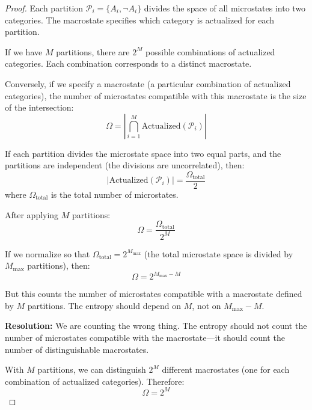 \documentclass[twocolumn,10pt]{article}
\theoremstyle{definition}
\theoremstyle{remark}
\begin{document}
\begin{proof}
Each partition $\mathcal{P}_i = \{A_i, \neg A_i\}$ divides the space of all microstates into two categories. The macrostate specifies which category is actualized for each partition.

If we have $M$ partitions, there are $2^M$ possible combinations of actualized categories. Each combination corresponds to a distinct macrostate.

Conversely, if we specify a macrostate (a particular combination of actualized categories), the number of microstates compatible with this macrostate is the size of the intersection:
\begin{equation}
\Omega = \left| \bigcap_{i=1}^{M} \text{Actualized}(\mathcal{P}_i) \right|
\end{equation}

If each partition divides the microstate space into two equal parts, and the partitions are independent (the divisions are uncorrelated), then:
\begin{equation}
\left| \text{Actualized}(\mathcal{P}_i) \right| = \frac{\Omega_{\text{total}}}{2}
\end{equation}
where $\Omega_{\text{total}}$ is the total number of microstates.

After applying $M$ partitions:
\begin{equation}
\Omega = \frac{\Omega_{\text{total}}}{2^M}
\end{equation}

If we normalize so that $\Omega_{\text{total}} = 2^{M_{\text{max}}}$ (the total microstate space is divided by $M_{\text{max}}$ partitions), then:
\begin{equation}
\Omega = 2^{M_{\text{max}} - M}
\end{equation}

But this counts the number of microstates compatible with a macrostate defined by $M$ partitions. The entropy should depend on $M$, not on $M_{\text{max}} - M$.

\vspace{0.2cm}
\noindent\textbf{Resolution:} We are counting the wrong thing. The entropy should not count the number of microstates compatible with the macrostate—it should count the number of distinguishable macrostates.

\vspace{0.2cm}
\noindent With $M$ partitions, we can distinguish $2^M$ different macrostates (one for each combination of actualized categories). Therefore:
\begin{equation}
\Omega = 2^M
\end{equation}
\end{proof}
\end{document}
